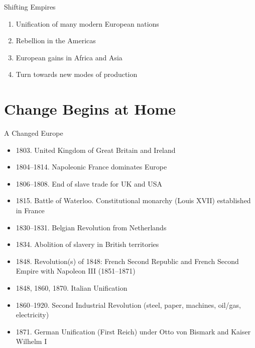 
% 

\begin{frame}{Shifting Empires}
	\begin{enumerate}
		\item<1->Unification of many modern European nations
		\item<2->Rebellion in the Americas
		\item<3->European gains in Africa and Asia
		\item<4->Turn towards new modes of production
	\end{enumerate}
\end{frame}

\section{Change Begins at Home}
\begin{frame}{A Changed Europe}
	\begin{itemize}
		\item<1->1803. United Kingdom of Great Britain and Ireland
		\item<2->1804--1814. Napoleonic France dominates Europe
		\item<3->1806--1808. End of slave trade for UK and USA
		\item<4->1815. Battle of Waterloo. Constitutional monarchy (Louis XVII) established in France
		\item<5->1830--1831. Belgian Revolution from Netherlands
		\item<6->1834. Abolition of slavery in British territories
		\item<7->1848. Revolution(s) of 1848: French Second Republic and French Second Empire with Napoleon III (1851--1871)
		\item<8->1848, 1860, 1870. Italian Unification
		\item<9->1860--1920. Second Industrial Revolution (steel, paper, machines, oil/gas, electricity)
		\item<10->1871. German Unification (First Reich) under Otto von Bismark and Kaiser Wilhelm I
	\end{itemize}
\end{frame}

